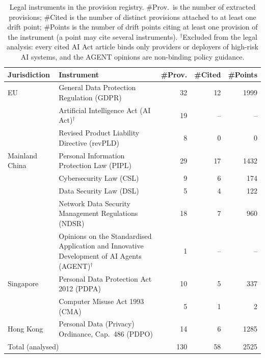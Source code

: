 \begin{table}[t]
\centering
\small
\setlength{\tabcolsep}{6pt}
\begin{tabularx}{\textwidth}{l X r r r}
\toprule
\textbf{Jurisdiction} & \textbf{Instrument} & \textbf{\#Prov.} & \textbf{\#Cited} & \textbf{\#Points} \\
\midrule
EU & General Data Protection Regulation (GDPR) & 32 & 12 & 1999 \\
 & Artificial Intelligence Act (AI Act)$^\dagger$ & 19 & -- & -- \\
 & Revised Product Liability Directive (revPLD) & 8 & 0 & 0 \\
Mainland China & Personal Information Protection Law (PIPL) & 29 & 17 & 1432 \\
 & Cybersecurity Law (CSL) & 9 & 6 & 174 \\
 & Data Security Law (DSL) & 5 & 4 & 122 \\
 & Network Data Security Management Regulations (NDSR) & 18 & 7 & 960 \\
 & Opinions on the Standardised Application and Innovative Development of AI Agents (AGENT)$^\dagger$ & 1 & -- & -- \\
Singapore & Personal Data Protection Act 2012 (PDPA) & 10 & 5 & 337 \\
 & Computer Misuse Act 1993 (CMA) & 5 & 1 & 2 \\
Hong Kong & Personal Data (Privacy) Ordinance, Cap.~486 (PDPO) & 14 & 6 & 1285 \\
\midrule
\multicolumn{2}{l}{Total (analysed)} & 130 & 58 & 2525 \\
\bottomrule
\end{tabularx}
\caption{Legal instruments in the provision registry. \#Prov.\ is the number of extracted provisions; \#Cited is the number of distinct provisions attached to at least one drift point; \#Points is the number of drift points citing at least one provision of the instrument (a point may cite several instruments). $^\dagger$Excluded from the legal analysis: every cited AI Act article binds only providers or deployers of high-risk AI systems, and the AGENT opinions are non-binding policy guidance.}
\label{tab:legal_instruments}
\end{table}
